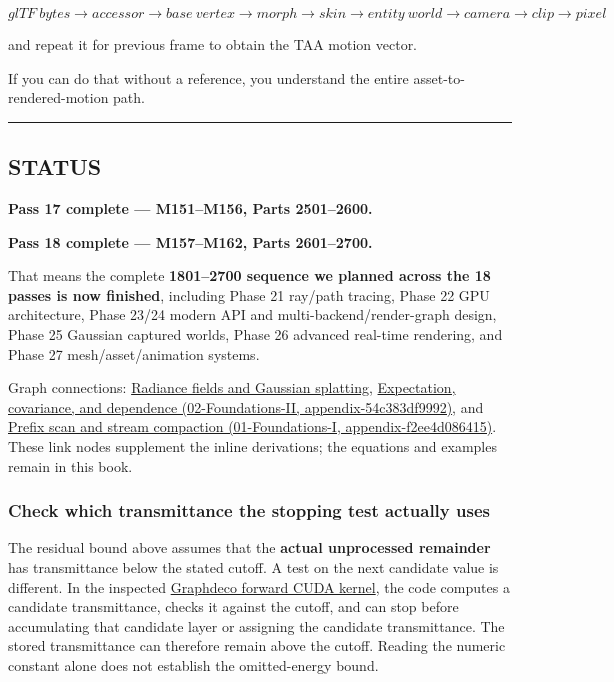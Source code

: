 \[
\boxed{
glTF\ bytes
\rightarrow
accessor
\rightarrow
base\ vertex
\rightarrow
morph
\rightarrow
skin
\rightarrow
entity\ world
\rightarrow
camera
\rightarrow
clip
\rightarrow
pixel
}
\]

and repeat it for previous frame to obtain the TAA motion vector.

If you can do that without a reference, you understand the entire asset-to-rendered-motion path.

\begin{center}\rule{0.5\linewidth}{0.5pt}\end{center}

\subsection{STATUS}\label{04-visual-computing-ii-ch041-status}

\textbf{Pass 17 complete --- M151--M156, Parts 2501--2600.}

\textbf{Pass 18 complete --- M157--M162, Parts 2601--2700.}

That means the complete \textbf{1801--2700 sequence we planned across the 18 passes is now finished}, including Phase 21 ray/path tracing, Phase 22 GPU architecture, Phase 23/24 modern API and multi-backend/render-graph design, Phase 25 Gaussian captured worlds, Phase 26 advanced real-time rendering, and Phase 27 mesh/asset/animation systems.

Graph connections: \hyperref[appendix-c5b332e400e7]{Radiance fields and Gaussian splatting}, \href{../02-Foundations-II/main.pdf\#nameddest=appendix-54c383df9992}{Expectation, covariance, and dependence (02-Foundations-II, appendix-54c383df9992)}, and \href{../01-Foundations-I/main.pdf\#nameddest=appendix-f2ee4d086415}{Prefix scan and stream compaction (01-Foundations-I, appendix-f2ee4d086415)}. These link nodes supplement the inline derivations; the equations and examples remain in this book.

\subsubsection{Check which transmittance the stopping test actually uses}\label{04-visual-computing-ii-ch041-check-which-transmittance-the-stopping-test-actually-uses}

The residual bound above assumes that the \textbf{actual unprocessed remainder} has transmittance below the stated cutoff. A test on the next candidate value is different. In the inspected \href{https://github.com/graphdeco-inria/diff-gaussian-rasterization/blob/main/cuda_rasterizer/forward.cu}{Graphdeco forward CUDA kernel}, the code computes a candidate transmittance, checks it against the cutoff, and can stop before accumulating that candidate layer or assigning the candidate transmittance. The stored transmittance can therefore remain above the cutoff. Reading the numeric constant alone does not establish the omitted-energy bound.

